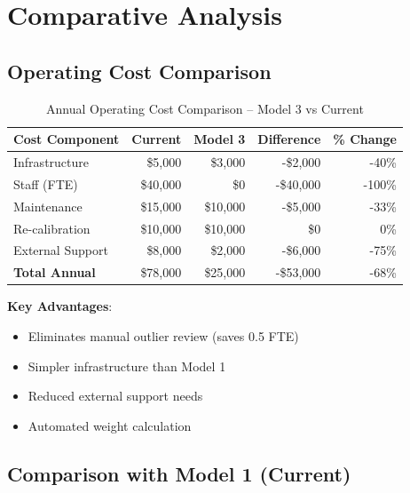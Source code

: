 \section{Comparative Analysis}

\subsection{Operating Cost Comparison}

\begin{table}[h]
\centering
\caption{Annual Operating Cost Comparison -- Model 3 vs Current}
\begin{tabular}{lrrrr}
\toprule
\textbf{Cost Component} & \textbf{Current} & \textbf{Model 3} & \textbf{Difference} & \textbf{\% Change} \\
\midrule
Infrastructure & \$5,000 & \$3,000 & -\$2,000 & -40\% \\
Staff (FTE) & \$40,000 & \$0 & -\$40,000 & -100\% \\
Maintenance & \$15,000 & \$10,000 & -\$5,000 & -33\% \\
Re-calibration & \$10,000 & \$10,000 & \$0 & 0\% \\
External Support & \$8,000 & \$2,000 & -\$6,000 & -75\% \\
\midrule
\textbf{Total Annual} & \$78,000 & \$25,000 & -\$53,000 & -68\% \\
\bottomrule
\end{tabular}
\end{table}

\textbf{Key Advantages}:
\begin{itemize}
    \item Eliminates manual outlier review (saves 0.5 FTE)
    \item Simpler infrastructure than Model 1
    \item Reduced external support needs
    \item Automated weight calculation
\end{itemize}

\subsection{Comparison with Model 1 (Current)}

